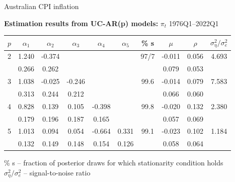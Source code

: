 \documentclass[notes,blackandwhite,mathsans,usenames,dvipsnames]{beamer}
\begin{document}
\begin{frame}{Australian CPI inflation}

\small
\begin{adjustwidth}{-0.5cm}{0cm}
\begin{center}
\textbf{Estimation results from UC-AR(p) models:} {\color{mcxs2}$\pi_t$ 1976Q1--2022Q1}

\footnotesize\smallskip\begin{tabular}{cccccccccc}
\toprule
$p$ & $\alpha_1$ & $\alpha_2$ & $\alpha_3$ & $\alpha_4$ & $\alpha_5$& \% s  & $\mu$ & $\rho$  & $\sigma^2_\eta / \sigma^2_e$\\
\midrule
2 & 1.240 & -0.374 &  &  &  & 97/7 & -0.011 & 0.056 & 4.693 \\ 
   & 0.266 & 0.262 &  &  &  &  & 0.079 & 0.053 &  \\ [1ex]
  3 & 1.038 & -0.025 & -0.246 &  &  & 99.6 & -0.014 & 0.079 & 7.583 \\ 
   & 0.313 & 0.244 & 0.212 &  &  &  & 0.066 & 0.060 &  \\ [1ex]
  4 & 0.828 & 0.139 & 0.105 & -0.398 &  & 99.8 & -0.020 & 0.132 & 2.380 \\ 
   & 0.179 & 0.196 & 0.187 & 0.165 &  &  & 0.057 & 0.069 &  \\ [1ex]
  5 & 1.013 & 0.094 & 0.054 & -0.664 & 0.331 & 99.1 & -0.023 & 0.102 & 1.184 \\ 
   & 0.132 & 0.149 & 0.148 & 0.154 & 0.126 &  & 0.058 & 0.064 &  \\ [1ex]
\bottomrule
\end{tabular}

\smallskip 
\% s -- fraction of posterior draws for which stationarity condition holds\\
$\sigma^2_\eta / \sigma^2_e$ -- signal-to-noise ratio
\end{center}
\end{adjustwidth}
\end{frame}
\end{document}
